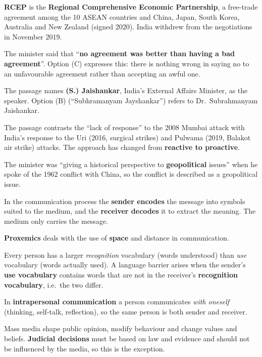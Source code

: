 \textbf{RCEP} is the \textbf{Regional Comprehensive Economic Partnership}, a free-trade agreement among the 10 ASEAN countries and China, Japan, South Korea, Australia and New Zealand (signed 2020). India withdrew from the negotiations in November 2019.

The minister said that ``\textbf{no agreement was better than having a bad agreement}''. Option (C) expresses this: there is nothing wrong in saying no to an unfavourable agreement rather than accepting an awful one.

The passage names \textbf{(S.) Jaishankar}, India's External Affairs Minister, as the speaker. Option (B) (``Subhramanyam Jayshankar'') refers to Dr.~Subrahmanyam Jaishankar.

The passage contrasts the ``lack of response'' to the 2008 Mumbai attack with India's response to the Uri (2016, surgical strikes) and Pulwama (2019, Balakot air strike) attacks. The approach has changed from \textbf{reactive to proactive}.

The minister was ``giving a historical perspective to \textbf{geopolitical} issues'' when he spoke of the 1962 conflict with China, so the conflict is described as a geopolitical issue.

In the communication process the \textbf{sender encodes} the message into symbols suited to the medium, and the \textbf{receiver decodes} it to extract the meaning. The medium only carries the message.

\textbf{Proxemics} deals with the use of \textbf{space} and distance in communication.

Every person has a larger \emph{recognition} vocabulary (words understood) than \emph{use} vocabulary (words actually used). A language barrier arises when the sender's \textbf{use vocabulary} contains words that are not in the receiver's \textbf{recognition vocabulary}, i.e.\ the two differ.

In \textbf{intrapersonal communication} a person communicates \emph{with oneself} (thinking, self-talk, reflection), so the same person is both sender and receiver.

Mass media shape public opinion, modify behaviour and change values and beliefs. \textbf{Judicial decisions} must be based on law and evidence and should not be influenced by the media, so this is the exception.

